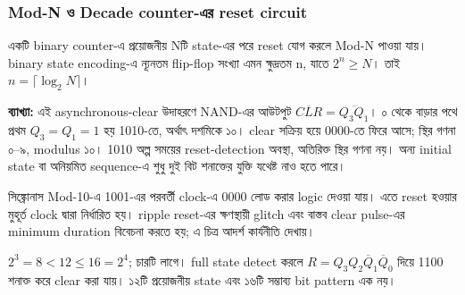 \subsubsection*{Mod-N ও Decade counter-এর reset circuit}
একটি binary counter-এ প্রয়োজনীয় Nটি state-এর পরে reset যোগ করলে Mod-N পাওয়া যায়। binary state encoding-এ ন্যূনতম flip-flop সংখ্যা এমন ক্ষুদ্রতম n, যাতে $2^n\geq N$। তাই $n=\lceil\log_2N\rceil$।

\begin{center}
\begin{minipage}{\linewidth}\centering\begin{chThreeDiagram}\end{chThreeDiagram}

\end{minipage}
\end{center}
\textbf{ব্যাখ্যা:} এই asynchronous-clear উদাহরণে NAND-এর আউটপুট $\overline{CLR}=\overline{Q_3Q_1}$। ০ থেকে বাড়ার পথে প্রথম $Q_3=Q_1=1$ হয় 1010-তে, অর্থাৎ দশমিকে ১০। clear সক্রিয় হয়ে 0000-তে ফিরে আসে; স্থির গণনা ০–৯, modulus ১০। 1010 অল্প সময়ের reset-detection অবস্থা, অতিরিক্ত স্থির গণনা নয়। অন্য initial state বা অনিয়মিত sequence-এ শুধু দুই বিট শনাক্তের যুক্তি যথেষ্ট নাও হতে পারে।

সিঙ্ক্রোনাস Mod-10-এ 1001-এর পরবর্তী clock-এ 0000 লোড করার logic দেওয়া যায়। এতে reset হওয়ার মুহূর্ত clock দ্বারা নির্ধারিত হয়। ripple reset-এর ক্ষণস্থায়ী glitch এবং বাস্তব clear pulse-এর minimum duration বিবেচনা করতে হয়; এ চিত্র আদর্শ কার্যনীতি দেখায়।

\chThreeAnswer $2^3=8<12\leq16=2^4$; চারটি লাগে। full state detect করলে $R=Q_3Q_2\overline Q_1\overline Q_0$ দিয়ে 1100 শনাক্ত করে clear করা যায়। ১২টি প্রয়োজনীয় state এবং ১৬টি সম্ভাব্য bit pattern এক নয়।

